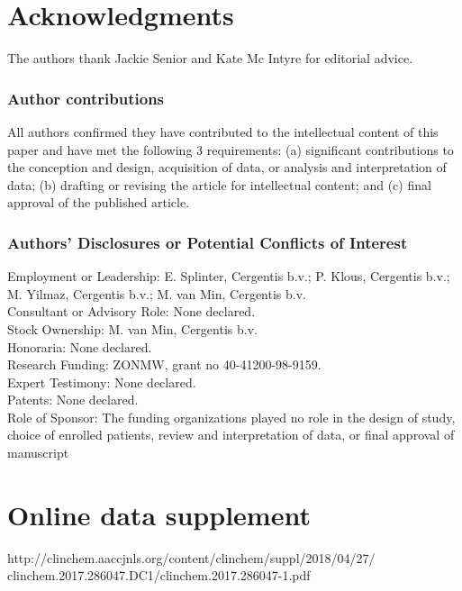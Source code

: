 \section{Acknowledgments}\label{Acknowledgments} 
The authors thank Jackie Senior and Kate Mc Intyre for editorial advice.

\subsubsection{Author contributions}
All authors confirmed they have contributed to the intellectual content of this paper and have met the following 3 requirements: (a) significant contributions to the conception and design, acquisition of data, or analysis and interpretation of data; (b) drafting or revising the article for intellectual content; and (c) final approval of the published article.

\subsubsection{Authors’ Disclosures or Potential Conflicts of Interest} 
Employment or Leadership: E. Splinter, Cergentis b.v.; P. Klous, Cergentis b.v.; M. Yilmaz, Cergentis b.v.; M. van Min, Cergentis b.v. \\
Consultant or Advisory Role: None declared. \\
Stock Ownership: M. van Min, Cergentis b.v. \\
Honoraria: None declared. \\
Research Funding: ZONMW, grant no 40-41200-98-9159. \\
Expert Testimony: None declared. \\
Patents: None declared.\\
Role of Sponsor: The funding organizations played no role in the design of study, choice of enrolled patients, review and interpretation of data, or final approval of manuscript

\section{Online data supplement}\label{Online data supplement}
http://clinchem.aaccjnls.org/content/clinchem/suppl/2018/04/27/\\clinchem.2017.286047.DC1/clinchem.2017.286047-1.pdf

